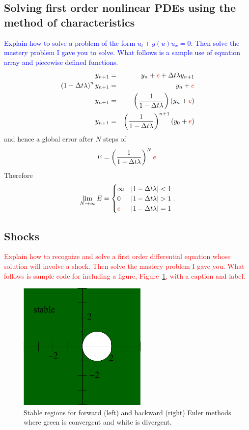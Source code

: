 \documentclass{article}
\newcommand{\bea}{\begin{eqnarray*}}
\newcommand{\eea}{\end{eqnarray*}}
\newcommand{\red}[1]{\textcolor{red}{#1}}
\newcommand{\blue}[1]{\textcolor{blue}{#1}}
\begin{document}
\subsection{Solving first order nonlinear PDEs using the method of characteristics}
\blue{Explain how to solve a problem of the form $u_t+g(u)u_x=0$. Then solve the mastery problem I gave you to solve. What follows is a sample use of equation array and piecewise defined functions.}
  \bea
y_{n+1} &=& y_n+\red{e} + \Delta t \lambda y_{n+1} \\
\left(1-\Delta t
\lambda\right)^ny_{n+1} &=& y_n+\red{e} \\
y_{n+1} &=& \left(\frac{1}{1-\Delta t \lambda}\right)(y_n+\red{e}) \\
y_{n+1} &=& \left(\frac{1}{1-\Delta t \lambda}\right)^{n+1}(y_0+\red{e}) 
\eea
and hence a global error after $N$ steps of
$$E = \left(\frac{1}{1-\Delta t \lambda}\right)^N\red{e}.$$ Therefore
$$\lim_{N\to \infty} E = \begin{cases} \infty & 
  |1-\Delta t \lambda|<1 \\
 0 &  |1-\Delta t \lambda|>1 \\
  \red{e} & |1-\Delta t \lambda|=1
  \end{cases}.$$


\subsection{Shocks}
\red{Explain how to recognize and solve a first order differential equation whose solution will involve a shock. Then solve the mastery problem I gave you. What follows is sample code for including a figure, Figure~\ref{fig:example}, with a caption and label.}
\begin{figure}[ht]
\begin{center}
  \includegraphics[width=2.5in]{stability-backwardeuler}
  \end{center}
\caption{Stable regions for forward (left) and backward (right) Euler methods where green is
  convergent and white is divergent. \label{fig:example}}
\end{figure}
\end{document}
